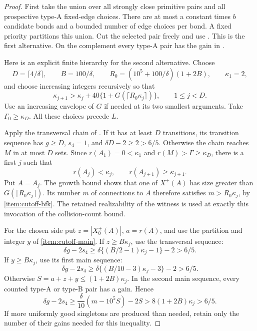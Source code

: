 \begin{proof}
First take the union over all strongly close primitive pairs and
all prospective type-A fixed-edge choices.  There are at most
a constant times \(b\) candidate bonds and a bounded number of
edge choices per bond.  A fixed priority partitions this union.
Cut the selected pair freely and use
.  This is the first alternative.
On the complement every type-A pair has the gain
in .

Here is an explicit finite hierarchy for the second alternative.
Choose
\[
 D=\lceil4/\delta\rceil,\qquad
 B=100/\delta,\qquad
 R_0=(10^5+100/\delta)(1+2B),\qquad
 \kappa_1=2,
\]
and choose increasing integers recursively so that
\[
 \kappa_{j+1}>
 \kappa_j+40\{1+G(\lceil R_0\kappa_j\rceil)\},
 \qquad 1\leq j<D .
\]
Use an increasing envelope of \(G\) if needed at its two
smallest arguments.  Take \(\Gamma_0\geq\kappa_D\).
All these choices precede \(L\).

Apply the transversal chain of .
If it has at least \(D\) transitions, its transition sequence
has \(g\geq D\), \(s_4=1\), and
\(\delta D-2\geq2>6/5\).
Otherwise the chain reaches \(M\) in at most \(D\) sets.
Since \(r(A_1)=0<\kappa_1\) and
\(r(M)>\Gamma\geq\kappa_D\), there is a first \(j\) such that
\[
 r(A_j)<\kappa_j,\qquad r(A_{j+1})\geq\kappa_{j+1}.
\]
Put \(A=A_j\).  The growth bound shows that one of
\(X^\pm(A)\) has size greater than
\(G(\lceil R_0\kappa_j\rceil)\).
Its number \(m\) of connections to \(A\) therefore satisfies
\(m>R_0\kappa_j\), by
\ref{item:cutoff-bfk}.
The retained realizability of the witness is used at exactly
this invocation of the collision-count bound.

For the chosen side put \(z=|X_0^\pm(A)|\), \(a=r(A)\),
and use the partition and integer \(y\) of
\ref{item:cutoff-main}.
If \(z\geq B\kappa_j\), use the transversal sequence:
\[
 \delta g-2s_4
 \geq \delta\{(B/2-1)\kappa_j-1\}-2>6/5 .
\]
If \(y\geq B\kappa_j\), use its first main sequence:
\[
 \delta g-2s_4
 \geq \delta\{(B/10-3)\kappa_j-3\}-2>6/5 .
\]
Otherwise \(S=a+z+y\leq(1+2B)\kappa_j\).
In the second main sequence, every counted type-A or type-B
pair has a gain.  Hence
\[
 \delta g-2s_4
 \geq \frac{\delta}{10}(m-10^5S)-2S
 > 8(1+2B)\kappa_j>6/5 .
\]
If more uniformly good singletons are produced than needed,
retain only the number of their gains needed for this inequality.


\end{proof}
